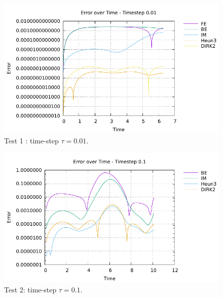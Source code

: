 \documentclass[10pt]{article}
\begin{document}
 \begin{figure}[H]
 \begin{center}
    \includegraphics[width=1\textwidth]{plot1_001.pdf}
  \end{center}
  \caption{Test 1 : time-step $\tau = 0.01$.
  \label{fig: 1_001}}
\end{figure}

 \begin{figure}[H]
 \begin{center}
    \includegraphics[width=1\textwidth]{plot2_01.pdf}
  \end{center}
  \caption{Test 2: time-step $\tau = 0.1$.
  \label{fig:2_01}}
\end{figure}
\end{document}
